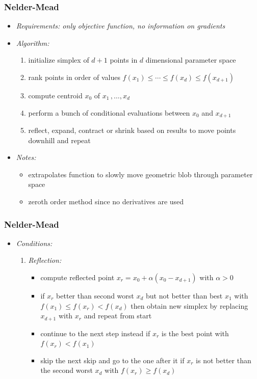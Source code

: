 	\begin{frame}
		\frametitle{Nelder-Mead}
		\begin{itemize}
			\item<2-> \itshape{Requirements:} only objective function, no information on gradients
			\item<3-> \itshape{Algorithm:}
				\begin{enumerate}
					\item<4-> initialize simplex of $d+1$ points in $d$ dimensional parameter space
					\item<5-> rank points in order of values $f(x_1) \leq \cdots \leq f(x_d) \leq f(x_{d+1})$
					\item<6-> compute centroid $x_0$ of $x_1\, , \ldots , x_d$
					\item<7-> perform a bunch of conditional evaluations between $x_0$ and $x_{d+1}$
					\item<8-> reflect, expand, contract or shrink based on results to move points downhill and repeat
				\end{enumerate}
			\item<9-> \itshape{Notes:}
				\begin{itemize}
					\item<10-> extrapolates function to slowly move geometric blob through parameter space
					\item<11-> zeroth order method since no derivatives are used
				\end{itemize}
		\end{itemize}
	\end{frame}

	\begin{frame}[noframenumbering]
		\frametitle{Nelder-Mead}
		\begin{itemize}
			\item<2-> \itshape{Conditions:}
				\begin{enumerate}
					\item<3-> \itshape{Reflection:}
					\begin{itemize}
						\item<4-> compute reflected point $x_r = x_0 + \alpha(x_0 - x_{d+1})$ with $\alpha > 0$
						\item<5-> if $x_r$ better than second worst $x_d$ but not better than best $x_1$ with $f(x_1) \leq f(x_r) < f(x_d)$ then
								  obtain new simplex by replacing $x_{d+1}$ with $x_r$ and repeat from start
						\item<6-> continue to the next step instead if $x_r$ is the best point with $f(x_r) < f(x_1)$
						\item<7-> skip the next skip and go to the one after it if $x_r$ is not better than the second worst $x_d$ with
								  $f(x_r) \geq f(x_d)$
					\end{itemize}
				\end{enumerate}
		\end{itemize}
	\end{frame}

